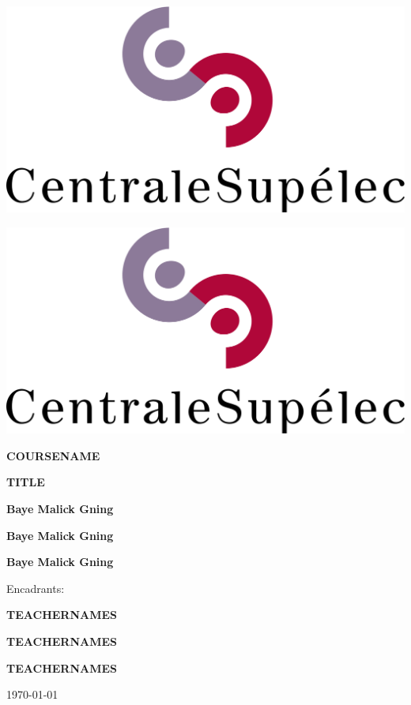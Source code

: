 \begin{titlepage}
    \centering
    \noindent
    \begin{minipage}{0.5\textwidth} \includegraphics[width=0.5\linewidth]{./images/logo-cs} %
    \end{minipage}\hfill
    \begin{minipage}{0.5\textwidth}
    \flushright
    \includegraphics[width=0.5\linewidth]{./images/logo-cs}
    \end{minipage}
    
    \vspace{2cm}

    {\Huge\bfseries COURSENAME\par}\vspace{1cm}

    \hrulefill

    {\huge\bfseries TITLE\par}


    \hrulefill
    
    \vspace{0.5cm}
    {\Large\bfseries Baye Malick Gning\par}\vspace{0.5cm}
    {\Large\bfseries Baye Malick Gning\par}\vspace{0.5cm}
    {\Large\bfseries Baye Malick Gning\par}\vspace{0.5cm}
    {\Large Encadrants: \par}\vspace{0.5cm}
    {\Large\bfseries TEACHERNAMES\par}\vspace{0.5cm}
    {\Large\bfseries TEACHERNAMES\par}\vspace{0.5cm}
    {\Large\bfseries TEACHERNAMES\par}\vspace{0.5cm}
    {\Large \today \par}

\end{titlepage}
